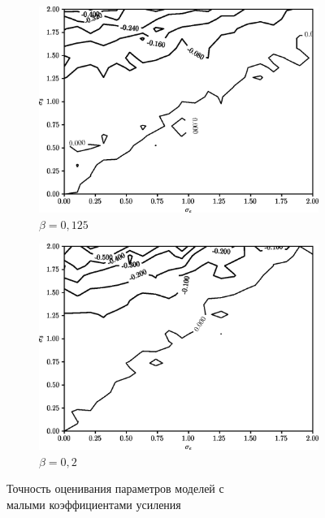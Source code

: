 \begin{figure}[p]
  \begin{subfigure}[b]{\linewidth}
    \centering
    \includegraphics[width=135mm]{fig/linear/param/beta-0,125_param.png}
    \caption{\( \beta = 0{,}125 \)}
  \end{subfigure}

  \vspace{2\baselineskip}
  \begin{subfigure}[b]{\linewidth}
    \centering
    \includegraphics[width=135mm]{fig/linear/param/beta-0,2_param.png}
    \caption{\( \beta = 0{,}2 \)}
  \end{subfigure}

  \vspace{\baselineskip}
  \caption{%
    Точность оценивания параметров моделей с \\
    малыми коэффициентами усиления
  }\label{fig:comparison_linear_params_beta-small}
\end{figure}

